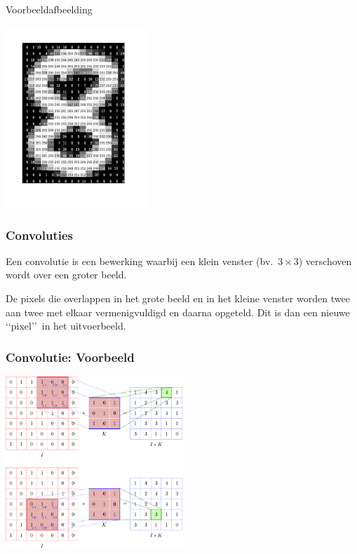 \documentclass[aspectratio=169]{beamer}
\begin{document}
\begin{frame}{Voorbeeldafbeelding}
\begin{center}
	\includegraphics[width=0.4\textwidth]{graphics/eight-pixels.png}
\end{center}
\end{frame}

\begin{frame}
\frametitle{Convoluties}

Een convolutie is een bewerking waarbij een klein venster (bv.\ $3\times 3$) verschoven wordt 
over een groter beeld. 

\vspace{0.5cm}

De pixels die overlappen in het grote beeld en in het kleine venster worden twee aan twee met elkaar vermenigvuldigd 
en daarna opgeteld. Dit is dan een nieuwe \lq\lq pixel\rq\rq\ in het uitvoerbeeld.

\vspace{0.5cm}


\end{frame}

\begin{frame}
\frametitle{Convolutie: Voorbeeld}

\begin{center}
	\includegraphics[width=0.5\textwidth]{graphics/conv-1}
\end{center}

\end{frame}
\end{document}
